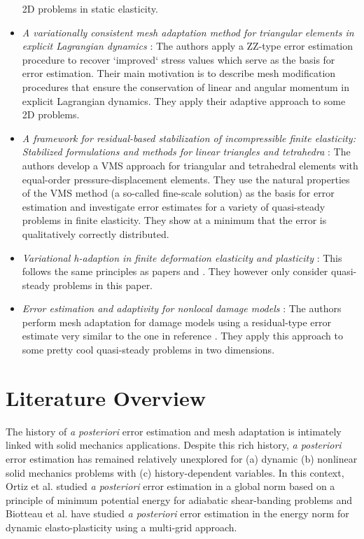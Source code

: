 \documentclass{article}
\begin{document}
\begin{itemize}
2D problems in static elasticity.
\item
\emph{A variationally consistent mesh adaptation method for triangular
elements in explicit Lagrangian dynamics} \cite{lahiri2010variationally}:
The authors apply a ZZ-type error estimation procedure to recover
`improved` stress values which serve as the basis for error estimation.
Their main motivation is to describe mesh modification procedures that ensure
the conservation of linear and angular momentum in explicit Lagrangian
dynamics. They apply their adaptive approach to some 2D problems.
\item
\emph{A framework for residual-based stabilization of incompressible finite
elasticity: Stabilized formulations and methods for linear triangles and
tetrahedra} \cite{masud2013framework}: The authors develop a VMS approach
for triangular and tetrahedral elements with equal-order pressure-displacement
elements. They use the natural properties of the VMS method (a so-called
fine-scale solution) as the basis for error estimation and investigate
error estimates for a variety of quasi-steady problems in finite elasticity.
They show at a minimum that the error is qualitatively correctly
distributed.
\item
\emph{Variational h-adaption in finite deformation elasticity and plasticity}
\cite{rodríguez2000error}: This follows the same principles as papers
\cite{radovitzky1999error} and \cite{molinari2002three}. They however only
consider quasi-steady problems in this paper.  \item
\emph{Error estimation and adaptivity for nonlocal damage models}
\cite{rodríguez2000error}: The authors perform mesh adaptation for damage
models using a residual-type error estimate very similar to the one in
reference \cite{diez2000adaptivity}. They apply this approach to some pretty
cool quasi-steady problems in two dimensions.
\end{itemize}

\section{Literature Overview}

The history of \emph{a posteriori} error estimation and mesh adaptation is
intimately linked with solid mechanics applications. Despite this rich
history, \emph{a posteriori} error estimation has remained relatively
unexplored for (a) dynamic (b) nonlinear solid mechanics problems with
(c) history-dependent variables. In this context, Ortiz et al.
\cite{radovitzky1999error, mosler2007variational} studied \emph{a posteriori}
error estimation in a global norm based on a principle of minimum potential
energy for adiabatic shear-banding problems and Biotteau et al.
\cite{biotteau2012three} have studied \emph{a posteriori} error estimation in
the energy norm for dynamic elasto-plasticity using a multi-grid approach.
\end{document}
